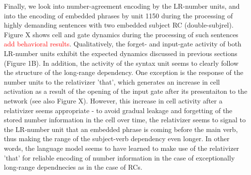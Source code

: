 Finally, we look into number-agreement encoding by the LR-number units, and into the encoding of embedded phrases by unit 1150 during the processing of highly demanding sentences with two embedded subject RC (double-subjrel). Figure X shows cell and gate dynamics during the processing of such sentences \textcolor{red}{add behavioral results}. Qualitatively, the forget- and input-gate activity of both LR-number units exhibit the expected dynamics discussed in previous sections (Figure 1B). In addition, the activity of the syntax unit seems to clearly follow the structure of the long-range dependency. One exception is the response of the number units to the relativizer 'that', which generates an increase in cell activation as a result of the opening of the input gate after its presentaiton to the network (see also Figure X). However, this increase in cell activity after a relativizer seems appropriate - to avoid gradual leakage and forgetting of the stored number information in the cell over time, the relativizer seems to signal to the LR-number unit that an embedded phrase is coming before the main verb, thus making the range of the subject-verb dependency even longer. In other words, the language model seems to have learned to make use of the relativizer 'that' for reliable encoding of number information in the case of exceptionally long-range dependnecies as in the case of RCs.
